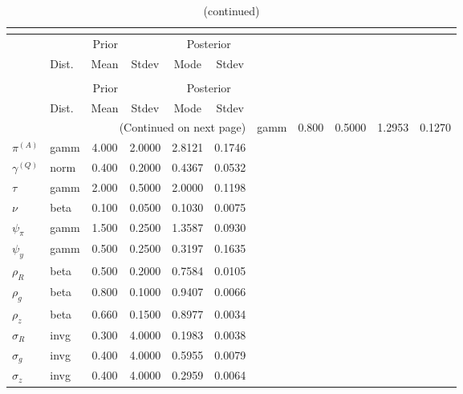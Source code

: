  
\begin{center}
\begin{longtable}{llcccc} 
\caption{Results from posterior maximization (parameters)}\\
 \label{Table:Posterior:1}\\
\toprule 
  & \multicolumn{3}{c}{Prior}  &  \multicolumn{2}{c}{Posterior} \\
  \cmidrule(r{.75em}){2-4} \cmidrule(r{.75em}){5-6}
  & Dist. & Mean  & Stdev & Mode & Stdev \\ 
\midrule \endfirsthead 
\caption{(continued)}\\
 \bottomrule 
  & \multicolumn{3}{c}{Prior}  &  \multicolumn{2}{c}{Posterior} \\
  \cmidrule(r{.75em}){2-4} \cmidrule(r{.75em}){5-6}
  & Dist. & Mean  & Stdev & Mode & Stdev \\ 
\midrule \endhead 
\bottomrule \multicolumn{6}{r}{(Continued on next page)}\endfoot 
\bottomrule\endlastfoot 
${r_{A}}$ & gamm &   0.800 & 0.5000 &   1.2953 &  0.1270 \\ 
${\pi^{(A)}}$ & gamm &   4.000 & 2.0000 &   2.8121 &  0.1746 \\ 
${\gamma^{(Q)}}$ & norm &   0.400 & 0.2000 &   0.4367 &  0.0532 \\ 
${\tau}$ & gamm &   2.000 & 0.5000 &   2.0000 &  0.1198 \\ 
${\nu}$ & beta &   0.100 & 0.0500 &   0.1030 &  0.0075 \\ 
${\psi_\pi}$ & gamm &   1.500 & 0.2500 &   1.3587 &  0.0930 \\ 
${\psi_y}$ & gamm &   0.500 & 0.2500 &   0.3197 &  0.1635 \\ 
${\rho_R}$ & beta &   0.500 & 0.2000 &   0.7584 &  0.0105 \\ 
${\rho_{g}}$ & beta &   0.800 & 0.1000 &   0.9407 &  0.0066 \\ 
${\rho_z}$ & beta &   0.660 & 0.1500 &   0.8977 &  0.0034 \\ 
${\sigma_R}$ & invg &   0.300 & 4.0000 &   0.1983 &  0.0038 \\ 
${\sigma_{g}}$ & invg &   0.400 & 4.0000 &   0.5955 &  0.0079 \\ 
${\sigma_z}$ & invg &   0.400 & 4.0000 &   0.2959 &  0.0064 \\ 
\end{longtable}
 \end{center}
